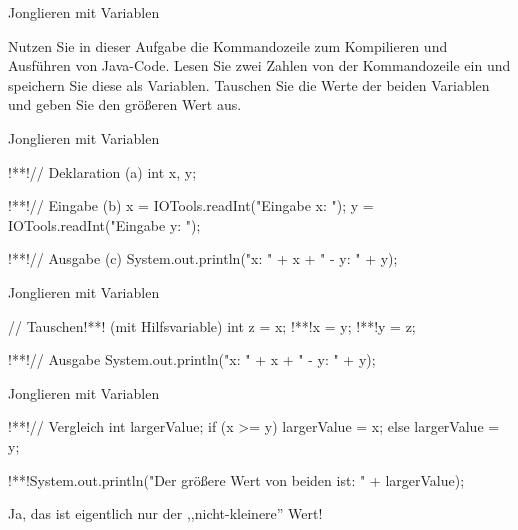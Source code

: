 \begin{frame}[fragile]{Jonglieren mit Variablen}\onslide<+->%
    \begin{exercise}
    Nutzen Sie in dieser Aufgabe die Kommandozeile zum Kompilieren und Ausführen von Java-Code.
    \medskip
    Lesen Sie zwei Zahlen von der Kommandozeile ein und speichern Sie diese als Variablen. Tauschen Sie die Werte der beiden Variablen und geben Sie den größeren Wert aus.
    \end{exercise}
\end{frame}
\begin{frame}[fragile]{Jonglieren mit Variablen}\onslide<+->%
    \begin{solve}[a) + b) + c)]
    \begin{plainjava}
!*\onslide<+->*!// Deklaration (a)
int x, y;

!*\onslide<+->*!// Eingabe (b)
x = IOTools.readInt("Eingabe x: ");
y = IOTools.readInt("Eingabe y: ");

!*\onslide<+->*!// Ausgabe (c)
System.out.println("x: " + x + " - y: " + y);
    \end{plainjava}
    \end{solve}
\end{frame}
\resetframecounters
\begin{frame}[fragile]{Jonglieren mit Variablen}\onslide<+->%
    \begin{solve}[d)]
    \begin{plainjava}
// Tauschen!*\onslide<+->*! (mit Hilfsvariable)
int z = x;
!*\onslide<+->*!x = y;
!*\onslide<+->*!y = z;

!*\onslide<+->*!// Ausgabe
System.out.println("x: " + x + " - y: " + y);
    \end{plainjava}
    \end{solve}
\end{frame}
\resetframecounters
\begin{frame}[fragile]{Jonglieren mit Variablen}\onslide<+->%
    \begin{solve}[e)]
    \begin{plainjava}
!*\onslide<+->*!// Vergleich
int largerValue;
if (x >= y)
    largerValue = x;
else
    largerValue = y;

!*\onslide<+->*!System.out.println("Der größere Wert von beiden ist: " + largerValue);
    \end{plainjava}
\end{solve}
\onslide<+->Ja, das ist eigentlich nur der ,,nicht-kleinere'' Wert!
\end{frame}
